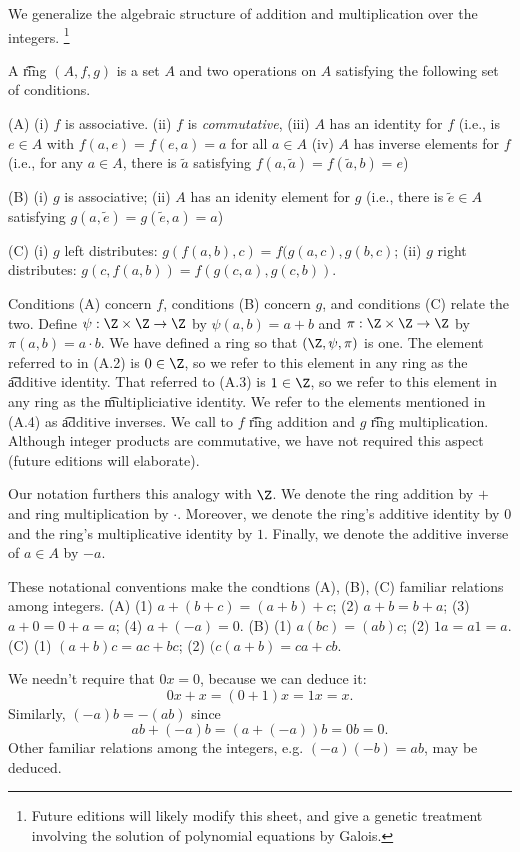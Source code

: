 

We generalize the algebraic structure of addition and multiplication over the integers.
  \ifhmode\unskip\fi\footnote{
Future editions will likely modify this sheet, and give a genetic treatment involving the solution of polynomial equations by Galois.
  }


A \t{ring} $(A, f, g)$ is a set $A$ and two operations on $A$ satisfying the following set of conditions.

(A)
(i) $f$ is associative.
(ii) $f$ is \textit{commutative},
(iii) $A$ has an identity for $f$ (i.e., is $e \in A$ with $f(a, e) = f(e, a) = a$ for all $a \in A$
(iv) $A$ has inverse elements for $f$ (i.e., for any $a \in A$, there is $\tilde{a} $ satisfying $f(a,\tilde{a}) = f(\tilde{a}, b) = e$)

(B)
(i) $g$ is associative;
(ii) $A$ has an idenity element for $g$ (i.e., there is $\tilde{e} \in A$ satisfying $g(a, \tilde{e}) = g(\tilde{e},a) = a$)

(C)
(i) $g$ left distributes: $g(f(a, b), c) = f(g(a,c), g(b,c)$;
(ii) $g$ right distributes: $g(c,f(a,b)) = f(g(c,a), g(c,b))$.

Conditions (A) concern $f$, conditions (B) concern $g$, and conditions (C) relate the two.
Define $\psi : \Z  \times \Z  \to \Z $ by $\psi (a, b) = a+b$ and $\pi : \Z  \times \Z  \to \Z $ by $\pi(a, b) = a\cdot b$.
We have defined a ring so that $(\Z , \psi , \pi )$ is one.
The element referred to in (A.2) is $0 \in \Z $, so we refer to this element in any ring as the \t{additive identity}.
That referred to (A.3) is $1 \in \Z $, so we refer to this element in any ring as the \t{multipliciative identity}.
We refer to the elements mentioned in (A.4) as \t{additive inverses}.
We call to $f$ \t{ring addition} and $g$ \t{ring multiplication}.
Although integer products are commutative, we have not required this aspect (future editions will elaborate).

Our notation furthers this analogy with $\Z $.
We denote the ring addition by $+$ and ring multiplication by $\cdot $.
Moreover, we denote the ring's additive identity by $0$ and the ring's multiplicative identity by $1$.
Finally, we denote the additive inverse of $a \in A$ by $-a$.

These notational conventions make the condtions (A), (B), (C) familiar relations among integers.
(A) (1) $a+(b + c) = (a+b)+c$; (2) $a+b = b+a$; (3) $a + 0 = 0 + a = a$; (4) $a + (-a) = 0$.
(B) (1) $a(bc) = (ab)c$; (2) $1a = a1 = a$.
(C) (1) $(a+b)c = ac + bc$; (2) $(c(a+b) = ca + cb$.

We needn't require that $0x = 0$, because we can deduce it:
  \[
0x + x = (0 + 1)x = 1x = x.
  \]
Similarly, $(-a)b = -(ab)$ since
  \[
ab + (-a)b = (a + (-a))b = 0b = 0.
  \]
Other familiar relations among the integers, e.g. $(-a)(-b) = ab$, may be deduced.
